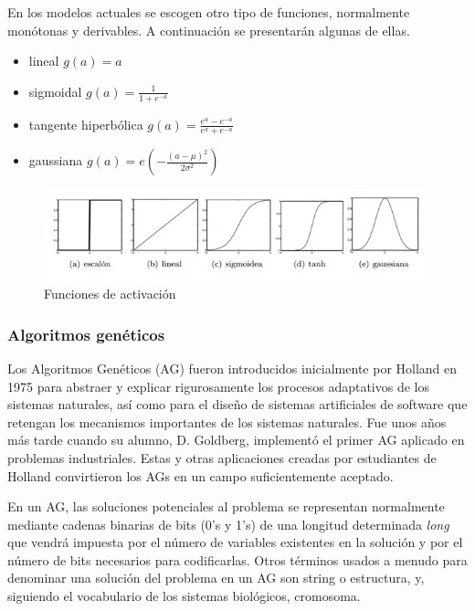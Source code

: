 En los modelos actuales se escogen otro tipo de funciones, normalmente monótonas y derivables. A continuación se presentarán algunas de ellas.

{\setlength{\baselineskip}{0.7\baselineskip}\begin{itemize}
	\item lineal $g(a)=a$
	\item sigmoidal $g(a) = \displaystyle \frac{1}{1 +e^{-a}}$
	\item tangente hiperbólica $g(a)= \displaystyle \frac{e^a -e^{-a}}{e^a + e^{-a}}$
	\item gaussiana $g(a) = e\left( \displaystyle -\frac{(a-\mu)^2}{2\sigma^2} \right) $
\end{itemize}}

\begin{figure}[H]
	\centering
	\includegraphics[width=0.8\linewidth]{Sources/funciones_activacion.png}
	\caption{Funciones de activación}
\end{figure}

\subsubsection{Algoritmos genéticos}
Los Algoritmos Genéticos (AG) fueron introducidos inicialmente por Holland en 1975 para abstraer y explicar rigurosamente los procesos adaptativos de los sistemas naturales, así como para el diseño de sistemas artificiales de software que retengan los mecanismos importantes de los sistemas naturales. Fue unos años más tarde cuando su alumno, D. Goldberg, implementó el primer AG aplicado en problemas industriales. Estas y otras aplicaciones creadas por estudiantes de Holland convirtieron los AGs en un campo suficientemente aceptado.

En un AG, las soluciones potenciales al problema se representan normalmente mediante cadenas binarias de bits (0’s y 1’s) de una longitud determinada \emph{long} que vendrá impuesta por el número de variables existentes en la solución y por el número de bits necesarios para codificarlas. Otros términos usados a menudo para denominar una solución del problema en un AG son string o estructura, y, siguiendo el vocabulario de los sistemas biológicos, cromosoma.

